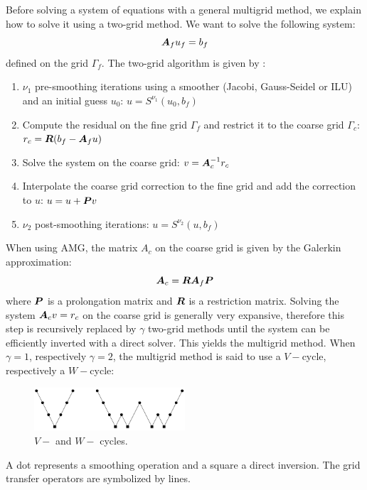 Before solving a system of equations with a general multigrid method, we
explain how to solve it using a two-grid method. We want to
solve the following system:
\begin{equation}
  \boldsymbol{A}_f u_f = b_f
\end{equation}
defined on the grid $\Gamma_f$.  The two-grid algorithm is given by :
\begin{enumerate}
  \item $\nu_1$ pre-smoothing iterations using a smoother (Jacobi,
    Gauss-Seidel or ILU) and an initial guess $u_0$: $u = S^{\nu_1}(u_0,b_f)$
  \item Compute the residual on the fine grid $\Gamma_f$ and restrict it to
    the coarse grid $\Gamma_c$: $r_c = \boldsymbol{R}(b_f-\boldsymbol{A}_f u)$
  \item Solve the system on the coarse grid: $v=\boldsymbol{A}_c^{-1} r_c$
  \item Interpolate the coarse grid correction to the fine grid and add the
    correction to $u$: $u=u+\boldsymbol{P}v$
  \item $\nu_2$ post-smoothing iterations: $u = S^{\nu_2}(u,b_f)$
\end{enumerate}
When using AMG, the matrix $A_c$ on the coarse grid is given by the Galerkin
approximation:
\begin{equation}
  \boldsymbol{A}_c = \boldsymbol{R}\boldsymbol{A}_f \boldsymbol{P}
\end{equation}
where $\boldsymbol{P}$ is a prolongation matrix and $\boldsymbol{R}$ is a restriction matrix.
Solving the system $\boldsymbol{A}_c v = r_c$ on the coarse grid is generally very
expansive, therefore this step is recursively replaced by $\gamma$ two-grid
methods until the system can be efficiently inverted with a direct solver.
This yields the multigrid method. When $\gamma = 1$, respectively $\gamma =
2$, the multigrid method is said to use a $V-$cycle, respectively a $W-$cycle:
\begin{figure}[H]
  \centering
  \includegraphics[width=0.5\textwidth]{./Dsa/v_w_cycles}
  \caption{$V-$ and $W-$ cycles.}
\end{figure}
A dot represents a smoothing operation and a square a direct inversion. The grid 
transfer operators are symbolized by lines.

